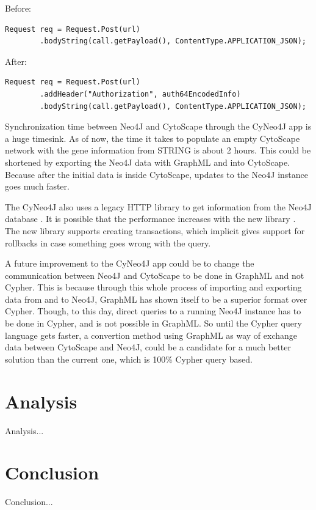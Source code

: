 \documentclass[UKenglish]{ifimaster}
\begin{document}
Before:
\begin{verbatim}
Request req = Request.Post(url)
        .bodyString(call.getPayload(), ContentType.APPLICATION_JSON);
\end{verbatim}

After:
\begin{verbatim}
Request req = Request.Post(url)
        .addHeader("Authorization", auth64EncodedInfo)
        .bodyString(call.getPayload(), ContentType.APPLICATION_JSON);
\end{verbatim}

Synchronization time between Neo4J and CytoScape through the CyNeo4J app is a
huge timesink. As of now, the time it takes to populate an empty CytoScape
network with the gene information from STRING is about 2 hours. This could be
shortened by exporting the Neo4J data with GraphML and into CytoScape. Because
after the initial data is inside CytoScape, updates to the Neo4J instance goes
much faster.

The CyNeo4J also uses a legacy HTTP library to get information from the Neo4J
database \cite{legacy-neo4j}. It is possible that the performance increases with
the new library \cite{transactional-neo4j}. The new library supports creating
transactions, which implicit gives support for rollbacks in case something goes
wrong with the query.

A future improvement to the CyNeo4J app could be to change the communication
between Neo4J and CytoScape to be done in GraphML and not Cypher. This is
because through this whole process of importing and exporting data from and to
Neo4J, GraphML has shown itself to be a superior format over Cypher. Though, to
this day, direct queries to a running Neo4J instance has to be done in Cypher,
and is not possible in GraphML. So until the Cypher query language gets faster,
a convertion method using GraphML as way of exchange data between CytoScape and
Neo4J, could be a candidate for a much better solution than the current one,
which is 100\% Cypher query based.

\part{Analysis}
Analysis...
\part{Conclusion}
Conclusion...
\backmatter{}
\printbibliography
\end{document}
